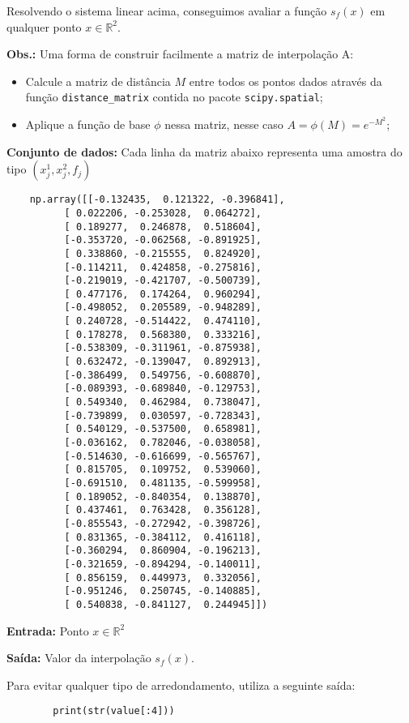 \documentclass{article}
\begin{document}
Resolvendo o sistema linear acima, conseguimos avaliar a função $s_{f}(x)$ em qualquer ponto $x \in \mathbb{R}^2$.

\textbf{Obs.:} Uma forma de construir facilmente a matriz de interpolação A:

\begin{itemize}
    \item Calcule a matriz de distância \( M \) entre todos os pontos dados através da função \texttt{distance\_matrix} contida no pacote \texttt{scipy.spatial};
    \item Aplique a função de base \( \phi \) nessa matriz, nesse caso \( A = \phi(M) = e^{-M^2} \);
\end{itemize}

\textbf{Conjunto de dados:} Cada linha da matriz abaixo representa uma amostra do tipo $(x_{j}^1, x_{j}^2, f_j)$

\begin{center}
    \begin{verbatim}
    np.array([[-0.132435,  0.121322, -0.396841], 
          [ 0.022206, -0.253028,  0.064272],
          [ 0.189277,  0.246878,  0.518604],
          [-0.353720, -0.062568, -0.891925],
          [ 0.338860, -0.215555,  0.824920],
          [-0.114211,  0.424858, -0.275816],
          [-0.219019, -0.421707, -0.500739],
          [ 0.477176,  0.174264,  0.960294],
          [-0.498052,  0.205589, -0.948289],
          [ 0.240728, -0.514422,  0.474110],
          [ 0.178278,  0.568380,  0.333216],
          [-0.538309, -0.311961, -0.875938],
          [ 0.632472, -0.139047,  0.892913],
          [-0.386499,  0.549756, -0.608870],
          [-0.089393, -0.689840, -0.129753],
          [ 0.549340,  0.462984,  0.738047],
          [-0.739899,  0.030597, -0.728343],
          [ 0.540129, -0.537500,  0.658981],
          [-0.036162,  0.782046, -0.038058],
          [-0.514630, -0.616699, -0.565767],
          [ 0.815705,  0.109752,  0.539060],
          [-0.691510,  0.481135, -0.599958],
          [ 0.189052, -0.840354,  0.138870],
          [ 0.437461,  0.763428,  0.356128],
          [-0.855543, -0.272942, -0.398726],
          [ 0.831365, -0.384112,  0.416118],
          [-0.360294,  0.860904, -0.196213],
          [-0.321659, -0.894294, -0.140011],
          [ 0.856159,  0.449973,  0.332056],
          [-0.951246,  0.250745, -0.140885],
          [ 0.540838, -0.841127,  0.244945]])
    \end{verbatim}

\end{center}

\textbf{Entrada:} Ponto $x \in \mathbb{R}^2$

\textbf{Saída:} Valor da interpolação $s_{f}(x).$

Para evitar qualquer tipo de arredondamento, utiliza a seguinte saída:

\begin{center}
    \begin{verbatim}
        print(str(value[:4]))
    \end{verbatim}
\end{center}
\end{document}
